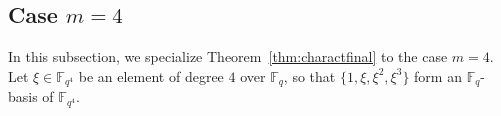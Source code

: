 \documentclass[11pt,a4paper,reqno]{article}
\numberwithin{equation}{section}
\theoremstyle{definition}
\begin{document}
\begin{table}[h]
\centering
\renewcommand{\arraystretch}{1.2}
\caption{\label{table:m=3}Leading term of $f(T)\bmod (T^{q^3}-T)$ for $m=3$ and $q\leq 17$.}
\end{table}

\subsection{Case $m=4$}

In this subsection, we specialize Theorem~\ref{thm:charactfinal} to the case \(m=4\).
Let \(\xi\in \mathbb F_{q^4}\) be an element of degree \(4\) over \(\mathbb F_q\), so that
\(\{1,\xi,\xi^2,\xi^3\}\) form an \(\mathbb F_q\)-basis of \(\mathbb F_{q^4}\).
\end{document}
